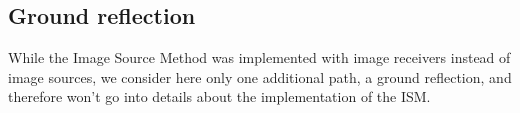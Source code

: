 %
%
%
%
%
%

\subsection{Ground reflection}
While the Image Source Method \cite{Mechel2013} was implemented with image
receivers instead of image sources, we consider here only one additional path,
a ground reflection, and therefore won't go into details about the
implementation of the ISM.

